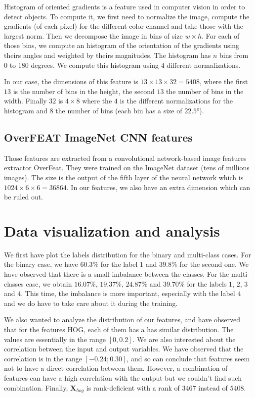 \documentclass{article} %
\begin{document}
Histogram of oriented gradients is a feature used in computer vision in order to detect objects. To compute it, we first need to normalize the image, compute the gradients (of each pixel) for the different color channel and take those with the largest norm. Then we decompose the image in bins of size $w \times h$. For each of those bins, we compute an histogram of the orientation of the gradients using theirs angles and weighted by theirs magnitudes. The histogram has $n$ bins from $0$ to $180$ degrees. We compute this histogram using $4$ different normalizations.

In our case, the dimensions of this feature is $13 \times 13 \times 32=5408$, where the first $13$ is the number of bins in the height, the second $13$ the number of bins in the width. Finally $32$ is $4 \times 8$ where the $4$ is the different normalizations for the histogram and $8$ the number of bins (each bin has a size of $22.5°$). 

\subsection{OverFEAT ImageNet CNN features}

Those features are extracted from a convolutional network-based image features extractor OverFeat. They were trained on the ImageNet dataset (tens of millions images). The size is the output of the fifth layer of the neural network which is $1024 \times 6 \times 6 = 36864$. In our features, we also have an extra dimension which can be ruled out.

\section{Data visualization and analysis}

We first have plot the labels distribution for the binary and multi-class cases. For the binary case, we have $60.3\%$ for the label $1$ and $39.8\%$ for the second one. We have observed that there is a small imbalance between the classes. For the multi-classes case, we obtain $16.07\%$, $19.37\%$, $24.87\%$ and $39.70\%$ for the labels $1$, $2$, $3$ and $4$. This time, the imbalance is more important, especially with the label $4$ and we do have to take care about it during the training.

We also wanted to analyze the distribution of our features, and have observed that for the features HOG, each of them has a has similar distribution. The values are essentially in the range $[0, 0.2]$. We are also interested about the correlation between the input and output variables. We have observed that the correlation is in the range $[-0.24 ;0.30]$, and so can conclude that features seem not to have a direct correlation between them. However, a combination of features can have a high correlation with the output but we couldn't find such combination. Finally, $\mathbf{X}_{hog}$ is rank-deficient with a rank of $3467$ instead of $5408$.
\end{document}
